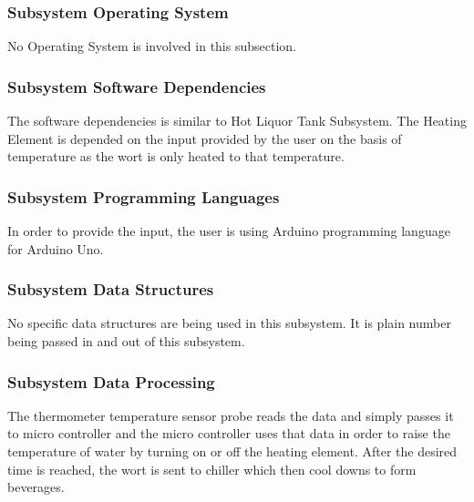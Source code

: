 \subsubsection{Subsystem Operating System}
No Operating System is involved in this subsection.

\subsubsection{Subsystem Software Dependencies}
The software dependencies is similar to Hot Liquor Tank Subsystem. The Heating Element is depended on the input provided by the user on the basis of temperature as the wort is only heated to that temperature.

\subsubsection{Subsystem Programming Languages}
In order to provide the input, the user is using Arduino programming language for Arduino Uno.

\subsubsection{Subsystem Data Structures}
No specific data structures are being used in this subsystem. It is plain number being passed in and out of this subsystem.

\subsubsection{Subsystem Data Processing}
The thermometer temperature sensor probe reads the data and simply passes it to micro controller and the micro controller uses that data in order to raise the temperature of water by turning on or off the heating element. After the desired time is reached, the wort is sent to chiller which then cool downs to form beverages. \newline
